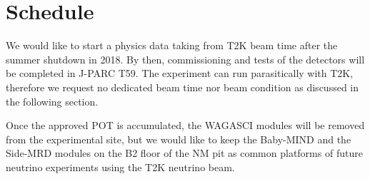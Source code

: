\section{Schedule}
We would like to start a physics data taking from T2K beam time after the summer shutdown in 2018.
By then, commissioning and tests of the detectors will be completed in J-PARC T59.
The experiment can run parasitically with T2K, therefore we request no dedicated beam time nor beam condition as discussed in the following section.


Once the approved POT is accumulated, the WAGASCI modules will be removed from the experimental site, but we would like to keep the Baby-MIND and the Side-MRD modules on the B2 floor of the NM pit as common platforms of future neutrino experiments using the T2K neutrino beam.
